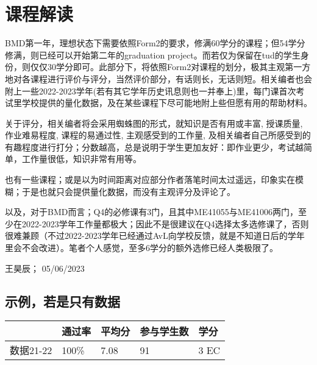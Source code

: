 \section{课程解读}
BMD第一年，理想状态下需要依照Form2的要求，修满60学分的课程；但54学分修满，则已经可以开始第二年的graduation project。而若仅为保留在tud的学生身份，则仅仅30学分即可。此部分下，将依照Form2对课程的划分，极其主观第一方地对各课程进行评价与评分，当然评价部分，有话则长，无话则短。相关编者也会附上一些2022-2023学年(若有其它学年历史讯息则也一并奉上)里，每门课首次考试里学校提供的量化数据，及在某些课程下尽可能地附上些但愿有用的帮助材料。

关于评分，相关编者将会采用蜘蛛图的形式，就知识是否有用或丰富, 授课质量, 作业难易程度, 课程的易通过性, 主观感受到的工作量, 及相关编者自己所感受到的有趣程度进行打分；分数越高，总是说明于学生更加友好：即作业更少，考试越简单，工作量很低，知识非常有用等。

也有一些课程；或是以为时间距离对应部分作者落笔时间太过遥远，印象实在模糊；于是也就只会提供量化数据，而没有主观评分及评论了。

以及，对于BMD而言；Q4的必修课有3门，且其中ME41055与ME41006两门，至少在2022-2023学年工作量都极大；因此不是很建议在Q4选择太多选修课了，否则很难兼顾（不过2022-2023学年已经通过AvL向学校反馈，就是不知道日后的学年里会不会改进）。笔者个人感觉，至多6学分的额外选修已经人类极限了。

\begin{flushright}
王昊辰； 05/06/2023
\end{flushright}

\subsection{示例，若是只有数据}
\begin{minipage}{\textwidth}
\centering
\begin{tabularx}{\textwidth}{l|X|X|X|X}
\textbf{ } &\textbf{通过率} & \textbf{平均分} & \textbf{参与学生数} & \textbf{学分} \\ \hline
数据21-22 & 100\% & 7.08 & 91 & 3 EC \\
\end{tabularx}
\end{minipage}






